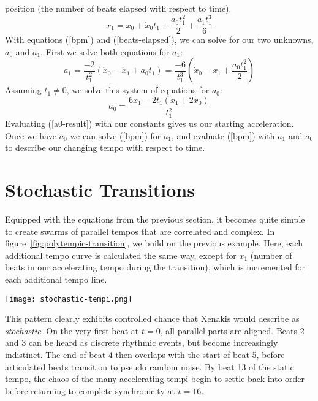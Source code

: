 position (the number of beats elapsed with respect to time).
\begin{equation}
	\label{beats-elapsed}
	x_1 = x_0 + \dot{x}_0t_1 + \frac{a_0t_1^2}{2} + \frac{a_1t_1^3}{6}
\end{equation}
With equations (\ref{bpm}) and (\ref{beats-elapsed}), we can solve for our 
two unknowns, $a_0$ and $a_1$. First we solve both equations for $a_1$:
\begin{displaymath}
    \label{a1-solution}
    a_1=
    \frac{-2}{t_1^2}(\dot{x}_0-\dot{x}_1 + a_0t_1)=
    \frac{-6}{t_1^3}(\dot{x}_0-x_1 + \frac{a_0t_1^2}{2})
\end{displaymath}
Assuming $t_1 \neq 0$, we solve this system of equations for $a_0$:
\begin{equation}
	\label{a0-result}
	a_0=\frac{6x_1-2t_1(\dot{x}_1+2\dot{x}_0)}{t_1^2}
\end{equation}
Evaluating (\ref{a0-result}) with our constants gives us our starting
acceleration. Once we have $a_0$ we can solve (\ref{bpm}) for $a_1$, and 
evaluate (\ref{bpm}) with $a_1$ and $a_0$ to describe our changing tempo 
with respect to time.

\section{Stochastic Transitions}
\label{sec:polytempic-implementation}
Equipped with the equations from the previous section, it becomes quite
simple to create swarms of parallel tempos that are correlated and
complex. In figure~\ref{fig:polytempic-transition}, we build on the
previous example. Here, each additional tempo curve is calculated the
same way, except for $x_1$ (number of beats in our accelerating tempo
during the transition), which is incremented for each additional tempo line. 
\begin{figure*}[h!]
  \texttt{[image: stochastic-tempi.png]}
  \caption{Stochastic Tempo Transition from 90~BPM to 120~BPM. Black
    dots are beats in our changing tempi. Grey dots show a
    continuation of beats at the initial tempo.
    $12 \leq x_1 \leq 20$}
  \label{fig:polytempic-transition}
\end{figure*}\hfill\break
This pattern clearly exhibits controlled chance that Xenakis would
describe as \emph{stochastic}. On the very first beat at $t=0$, all
parallel parts are aligned. Beats 2 and 3 can be heard as discrete
rhythmic events, but become increasingly indistinct. The end of beat 4
then overlaps with the start of beat 5, before articulated beats
transition to pseudo random noise. By beat 13 of the static tempo, the
chaos of the many accelerating tempi begin to settle back into order
before returning to complete synchronicity at $t=16$.

